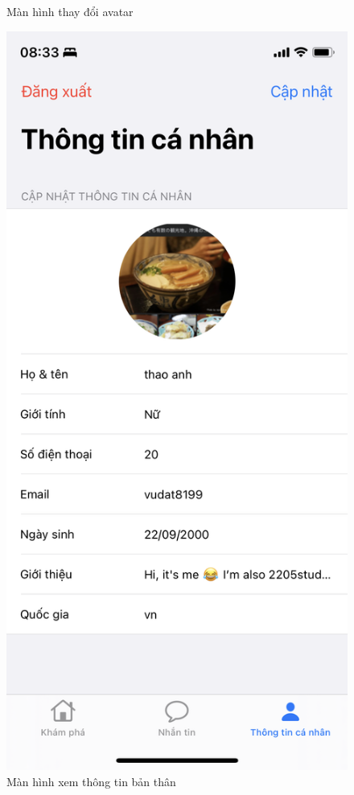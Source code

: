 \documentclass[../DoAn.tex]{subfiles}
\begin{document}
\begin{figure}[H]
\begin{minipage}{0.5\textwidth}
\caption{Màn hình thay đổi avatar} \label{fig:screen_login}
\end{minipage}
\hspace{\fill}
\begin{minipage}{0.5\textwidth}
\includegraphics[width=0.95\linewidth]{Hinhve/Application/Private_Profile.png}
\caption{Màn hình xem thông tin bản thân} \label{fig:list_task}
\end{minipage}
\end{figure}
\end{document}
